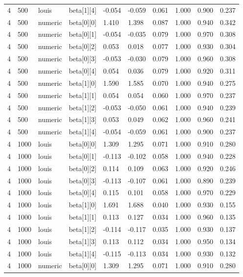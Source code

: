 \begin{table}
\begin{tabular}{llllllllll}
4 & 500 & louis & beta[1][4] & -0.054 & -0.059 & 0.061 & 1.000 & 0.900 & 0.237 \\
4 & 500 & numeric & beta[0][0] & 1.410 & 1.398 & 0.087 & 1.000 & 0.940 & 0.342 \\
4 & 500 & numeric & beta[0][1] & -0.054 & -0.035 & 0.079 & 1.000 & 0.970 & 0.308 \\
4 & 500 & numeric & beta[0][2] & 0.053 & 0.018 & 0.077 & 1.000 & 0.930 & 0.304 \\
4 & 500 & numeric & beta[0][3] & -0.053 & -0.030 & 0.079 & 1.000 & 0.960 & 0.308 \\
4 & 500 & numeric & beta[0][4] & 0.054 & 0.036 & 0.079 & 1.000 & 0.920 & 0.311 \\
4 & 500 & numeric & beta[1][0] & 1.590 & 1.585 & 0.070 & 1.000 & 0.940 & 0.275 \\
4 & 500 & numeric & beta[1][1] & 0.054 & 0.054 & 0.060 & 1.000 & 0.970 & 0.237 \\
4 & 500 & numeric & beta[1][2] & -0.053 & -0.050 & 0.061 & 1.000 & 0.940 & 0.239 \\
4 & 500 & numeric & beta[1][3] & 0.053 & 0.049 & 0.062 & 1.000 & 0.960 & 0.241 \\
4 & 500 & numeric & beta[1][4] & -0.054 & -0.059 & 0.061 & 1.000 & 0.900 & 0.237 \\
4 & 1000 & louis & beta[0][0] & 1.309 & 1.295 & 0.071 & 1.000 & 0.910 & 0.280 \\
4 & 1000 & louis & beta[0][1] & -0.113 & -0.102 & 0.058 & 1.000 & 0.940 & 0.228 \\
4 & 1000 & louis & beta[0][2] & 0.114 & 0.109 & 0.063 & 1.000 & 0.920 & 0.246 \\
4 & 1000 & louis & beta[0][3] & -0.113 & -0.107 & 0.061 & 1.000 & 0.890 & 0.239 \\
4 & 1000 & louis & beta[0][4] & 0.115 & 0.101 & 0.058 & 1.000 & 0.970 & 0.229 \\
4 & 1000 & louis & beta[1][0] & 1.691 & 1.688 & 0.040 & 1.000 & 0.930 & 0.155 \\
4 & 1000 & louis & beta[1][1] & 0.113 & 0.127 & 0.034 & 1.000 & 0.960 & 0.135 \\
4 & 1000 & louis & beta[1][2] & -0.114 & -0.117 & 0.035 & 1.000 & 0.930 & 0.137 \\
4 & 1000 & louis & beta[1][3] & 0.113 & 0.112 & 0.034 & 1.000 & 0.950 & 0.134 \\
4 & 1000 & louis & beta[1][4] & -0.115 & -0.113 & 0.034 & 1.000 & 0.930 & 0.132 \\
4 & 1000 & numeric & beta[0][0] & 1.309 & 1.295 & 0.071 & 1.000 & 0.910 & 0.280 \\

\end{tabular}
\end{table}
